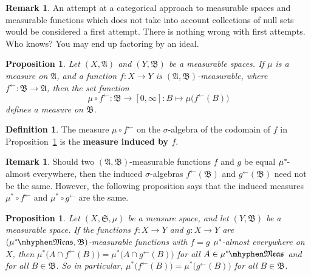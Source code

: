 \documentclass[
twoside=true,
paper=letter,
fontsize=11pt,
pagesize=auto,
leqno,
openany,
headsepline,
overfullrule,
]{scrbook}
\theoremstyle{plain}
\theoremstyle{plain}
\newtheorem{prop}[thm]{Proposition}
\theoremstyle{definition}
\newtheorem{defn}[thm]{Definition}
\newtheorem{rmk}[thm]{Remark}
\theoremstyle{bfnoteitalic}
\theoremstyle{bfnoteroman}
\newcommand{\sigalg}[1]{\mathfrak{#1}}
\newcommand{\textsigma}{\hbox{\large{$\sigma$}}\kern-1pt}
\newcommand{\preimage}[1]{#1^{\leftarrow}}
\newcommand{\meets}{\cap}
\newcommand{\semiring}{\sigalg{S}}
\newcommand{\sigmaalgebra}{\sigalg{A}}
\newcommand{\sigmaalgebraii}{\sigalg{B}}
\newcommand{\measurable}[1]{{#1}\mhyphen\mathfrak{Meas}}
\newcommand{\kernast}{\ast\kern-1pt}
\newcommand{\function}{f}
\newcommand{\measurespace}{X}
\newcommand{\measurespaceii}{Y}
\newcommand{\measure}{\mu}
\begin{document}
\begin{rmk}
An attempt at a categorical approach to measurable spaces and measurable functions which does not take into account collections of null sets would be considered a first attempt.  There is nothing wrong with first attempts. Who knows? You may end up factoring by an ideal.
\end{rmk}





\begin{prop}\label{function_induces_measure}
Let $(\measurespace,\sigmaalgebra)$  and  $(\measurespaceii, \sigmaalgebraii)$ be a measurable spaces.  
If $\measure$ is a measure on $\sigmaalgebra$, and a function $f:\measurespace\to\measurespaceii$ is 
$(\sigmaalgebra, \sigmaalgebraii)$\hyp{}measurable, where $\preimage{f}:\sigmaalgebraii\to\sigmaalgebra$,
then the set function
\[
\measure\circ\preimage{f} 
: \sigmaalgebraii\to [0,\infty] 
: B\mapsto \measure\bigl(\preimage{f}(B)\bigr)
\]
defines a measure on $\sigmaalgebraii$.
\end{prop}


\begin{defn}\label{induced_measure}
The measure $\measure\circ\preimage{\function}$ on the \textsigma-algebra of the codomain of $\function$ in Proposition~\ref{function_induces_measure} is the \textbf{measure induced by $\function$}.
\end{defn}



\begin{rmk} 
Should two $(\sigmaalgebra, \sigmaalgebraii)$\hyp{}measurable functions $f$ and $g$ be equal $\measure^\kernast$-almost everywhere, then the induced \textsigma-algebras $\preimage{f}(\sigmaalgebraii)$ and $\preimage{g}(\sigmaalgebraii)$  need not be the same. However, the following proposition says that the induced measures 
$\measure^*\circ \preimage{f}$ and $\measure^*\circ\preimage{g}$ are the same. 
\end{rmk}


\begin{prop}\label{class_induces_measure}
Let $(\measurespace,\semiring,\measure)$ be a measure space, and let $(\measurespaceii, \sigmaalgebraii)$ be a measurable space.  If  the functions 
$f:\measurespace\to\measurespaceii$ 
and
$g:\measurespace\to\measurespaceii$ 
are $(\measurable{\measure^\kernast}, \sigmaalgebraii)$\hyp{}measurable functions with 
$f = g$ $\measure^\kernast$-almost everywhere on $\measurespace$, then 
$\measure^*\bigl(A\meets \preimage{f}(B)\bigr) 
= 
\measure^*\bigl(A\meets \preimage{g}(B)\bigr)$ for all
$A\in \measurable{\measure^\kernast}$ and for all $B\in\sigmaalgebraii$.
So in particular,
$\measure^*\bigl(\preimage{f}(B)\bigr) 
= 
\measure^*\bigl(\preimage{g}(B)\bigr)$ for all
$B\in\sigmaalgebraii$.
\end{prop}
\end{document}
